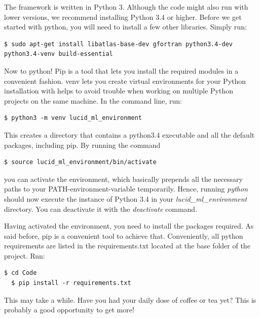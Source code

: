 \documentclass{article}
\begin{document}
The framework is written in Python 3. Although the code might also run with lower versions, we recommend installing Python 3.4 or higher.
Before we get started with python, you will need to install a few other libraries. Simply run:
\begin{lstlisting}[basicstyle=\ttfamily]
$ sudo apt-get install libatlas-base-dev gfortran python3.4-dev python3.4-venv build-essential
\end{lstlisting}
Now to python!
Pip is a tool that lets you install the required modules in a convenient fashion.
venv lets you create virtual environments for your Python installation with helps to avoid trouble when
working on multiple Python projects on the same machine. In the command line, run:
\begin{lstlisting}[basicstyle=\ttfamily]
$ python3 -m venv lucid_ml_environment
\end{lstlisting}
This creates a directory that contains a python3.4 executable and all the default packages, including pip. By running the command
\begin{lstlisting}[basicstyle=\ttfamily]
$ source lucid_ml_environment/bin/activate
\end{lstlisting}
you can activate the environment, which basically prepends all the necessary paths  to your PATH-environment-variable temporarily.
Hence, running \emph{python} should now execute the instance of Python 3.4 in your \emph{lucid\_ml\_environment} directory. You
can deactivate it with the \emph{deactivate} command.

Having activated the environment, you need to install the packages required. As said before, pip is a convenient tool to achieve that.
Conveniently, all python requirements are listed in the requirements.txt located at the base folder of the project.
Run:
\begin{lstlisting}[basicstyle=\ttfamily]
  $ cd Code
  $ pip install -r requirements.txt
\end{lstlisting}
This may take a while. Have you had your daily dose of coffee or tea yet? This is probably a good opportunity to get more!
\end{document}
